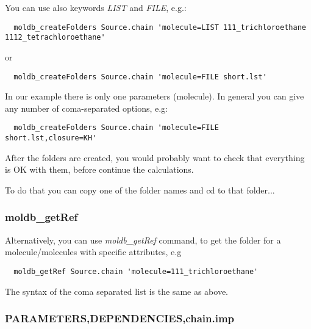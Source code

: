 \documentclass[12pt]{article}
\begin{document}
You can use also keywords \emph{LIST} and \emph{FILE}, e.g.:
\begin{verbatim}
  moldb_createFolders Source.chain 'molecule=LIST 111_trichloroethane 1112_tetrachloroethane'
\end{verbatim}
or 
\begin{verbatim}
  moldb_createFolders Source.chain 'molecule=FILE short.lst'
\end{verbatim}

In our example there is only one parameters (molecule).
In general you can give any number of coma-separated options, e.g:

\begin{verbatim}
  moldb_createFolders Source.chain 'molecule=FILE short.lst,closure=KH'
\end{verbatim}

After the folders are created, you would probably want to check that everything is OK with them, before continue the calculations.

To do that you can copy one of the folder names and cd to that folder...

\subsubsection{moldb\_getRef}

Alternatively, you can use \emph{moldb\_getRef} command, to get the folder for a molecule/molecules with specific attributes, e.g
\begin{verbatim}
  moldb_getRef Source.chain 'molecule=111_trichloroethane'
\end{verbatim}
The syntax of the coma separated list is the same as above.

\subsubsection{PARAMETERS,DEPENDENCIES,chain.imp}
\end{document}
